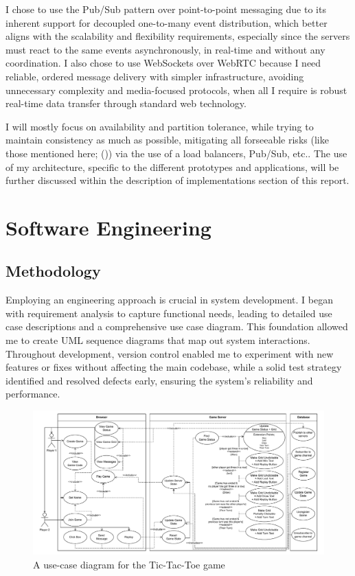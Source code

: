 \documentclass[]{final}
\begin{document}
I chose to use the Pub/Sub pattern over point-to-point messaging due to
its inherent support for decoupled one-to-many event distribution, which
better aligns with the scalability and flexibility requirements,
especially since the servers must react to the same events asynchronously,
in real-time and without any coordination. I also chose to use WebSockets over
WebRTC because I need reliable, ordered message
delivery with simpler infrastructure, avoiding unnecessary complexity and
media-focused protocols, when all I require is robust real-time data
transfer through standard web technology.

I will mostly focus on availability and partition tolerance, while trying to
maintain consistency as much as possible,
mitigating all forseeable risks (like those mentioned here; {\hypersetup{linkcolor=teal}(\pageref{rationale_problem})}) via the use of
a load balancers, Pub/Sub, etc.. The use of my architecture, specific to
the different prototypes and applications, will be further discussed within the
description of implementations section of this report.

\chapter{Software Engineering}

\section{Methodology}
Employing an engineering approach is crucial in system development. I began with
requirement analysis to capture functional needs, leading to detailed use case
descriptions and a comprehensive use case diagram. This foundation allowed me to
create UML sequence diagrams that map out system interactions. Throughout development,
version control enabled me to experiment with new features or fixes without
affecting the main codebase, while a solid test strategy identified and resolved
defects early, ensuring the system's reliability and performance.

\begin{figure}[ht!]
  \centering
  \includegraphics[width=\linewidth]{use_case}
  \vspace*{-0.5cm}
  \caption{A use-case diagram for the Tic-Tac-Toe game}
  \label{fig: 2}
\end{figure}
\end{document}
